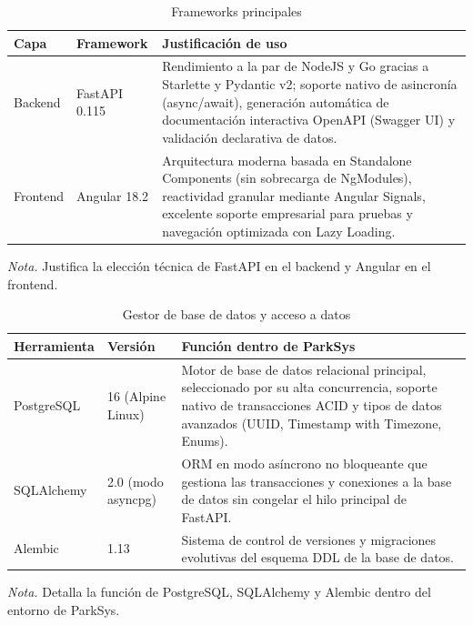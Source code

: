\begin{table}[htbp]
\caption{Frameworks principales}
\label{tab:frameworks}
\begin{tabular}{@{}p{2cm} p{3cm} p{10cm}@{}}
\toprule
\textbf{Capa} & \textbf{Framework} & \textbf{Justificación de uso} \\
\midrule
Backend & FastAPI 0.115 & Rendimiento a la par de NodeJS y Go gracias a Starlette y Pydantic v2; soporte nativo de asincronía (async/await), generación automática de documentación interactiva OpenAPI (Swagger UI) y validación declarativa de datos. \\
Frontend & Angular 18.2 & Arquitectura moderna basada en Standalone Components (sin sobrecarga de NgModules), reactividad granular mediante Angular Signals, excelente soporte empresarial para pruebas y navegación optimizada con Lazy Loading. \\
\bottomrule
\end{tabular}
\par\vspace{0.2cm}
\textit{Nota.} Justifica la elección técnica de FastAPI en el backend y Angular en el frontend.
\end{table}

\begin{table}[htbp]
\caption{Gestor de base de datos y acceso a datos}
\label{tab:bd}
\begin{tabular}{@{}p{3cm} p{3cm} p{9cm}@{}}
\toprule
\textbf{Herramienta} & \textbf{Versión} & \textbf{Función dentro de ParkSys} \\
\midrule
PostgreSQL & 16 (Alpine Linux) & Motor de base de datos relacional principal, seleccionado por su alta concurrencia, soporte nativo de transacciones ACID y tipos de datos avanzados (UUID, Timestamp with Timezone, Enums). \\
SQLAlchemy & 2.0 (modo asyncpg) & ORM en modo asíncrono no bloqueante que gestiona las transacciones y conexiones a la base de datos sin congelar el hilo principal de FastAPI. \\
Alembic & 1.13 & Sistema de control de versiones y migraciones evolutivas del esquema DDL de la base de datos. \\
\bottomrule
\end{tabular}
\par\vspace{0.2cm}
\textit{Nota.} Detalla la función de PostgreSQL, SQLAlchemy y Alembic dentro del entorno de ParkSys.
\end{table}

